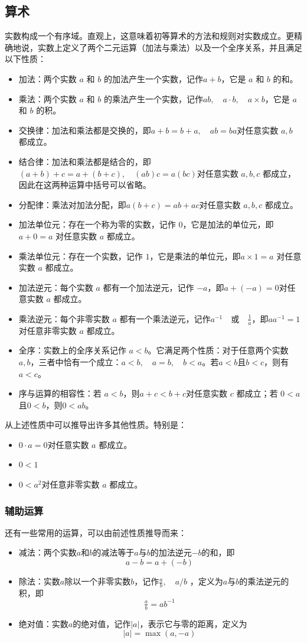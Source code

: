 \subsection{算术}
实数构成一个有序域。直观上，这意味着初等算术的方法和规则对实数成立。更精确地说，实数上定义了两个二元运算（加法与乘法）以及一个全序关系，并且满足以下性质：
\begin{itemize}
\item 加法：两个实数 $a$ 和 $b$ 的加法产生一个实数，记作$a+b$，它是 $a$ 和 $b$ 的和。
\item 乘法：两个实数 $a$ 和 $b$ 的乘法产生一个实数，记作$ab,\quad a\cdot b,\quad a\times b$，它是 $a$ 和 $b$ 的积。
\item 交换律：加法和乘法都是交换的，即$a+b=b+a,\quad ab=ba$对任意实数 $a, b$ 都成立。
\item 结合律：加法和乘法都是结合的，即$(a+b)+c=a+(b+c),\quad (ab)c=a(bc)$对任意实数 $a, b, c$ 都成立，因此在这两种运算中括号可以省略。
\item 分配律：乘法对加法分配，即$a(b+c)=ab+ac$对任意实数 $a, b, c$ 都成立。
\item 加法单位元：存在一个称为零的实数，记作 $0$，它是加法的单位元，即$a+0=a$
对任意实数 $a$ 都成立。
\item 乘法单位元：存在一个实数，记作 $1$，它是乘法的单位元，即$a\times 1=a$
对任意实数 $a$ 都成立。
\item 加法逆元：每个实数 $a$ 都有一个加法逆元，记作 $-a$，即$a+(-a)=0$对任意实数 $a$ 都成立。
\item 乘法逆元：每个非零实数 $a$ 都有一个乘法逆元，记作$a^{-1}\quad \text{或}\quad \tfrac{1}{a}$，即$aa^{-1}=1$对任意非零实数 $a$ 都成立。
\item 全序：实数上的全序关系记作 $a<b$。它满足两个性质：对于任意两个实数 $a, b$，三者中恰有一个成立：$a<b,\quad a=b,\quad b<a$。若$a<b$且$b<c$，则有 $a<c$。
\item 序与运算的相容性：若 $a<b$，则$a+c<b+c$对任意实数 $c$ 都成立；若 $0<a$且$0<b$，则$0<ab$。
\end{itemize}
从上述性质中可以推导出许多其他性质。特别是：
\begin{itemize}
\item $0 \cdot a = 0$对任意实数 $a$ 都成立。
\item $0 < 1$
\item $0 < a^{2}$对任意非零实数 $a$ 都成立。
\end{itemize}
\subsubsection{辅助运算}
还有一些常用的运算，可以由前述性质推导而来：
\begin{itemize}
\item 减法：两个实数$a$和$b$的减法等于$a$与$b$的加法逆元$-b$的和，即
  $$
  a-b=a+(-b)~
  $$
\item 除法：实数$a$除以一个非零实数$b$，记作$\tfrac{a}{b}, \quad a/b$
，定义为$a$与$b$的乘法逆元的积，即
  $$
  \tfrac{a}{b}=ab^{-1}~
  $$
\item 绝对值：实数$a$的绝对值，记作$|a|$，表示它与零的距离，定义为
  $$
  |a|=\max(a,-a)~
  $$
\end{itemize}
